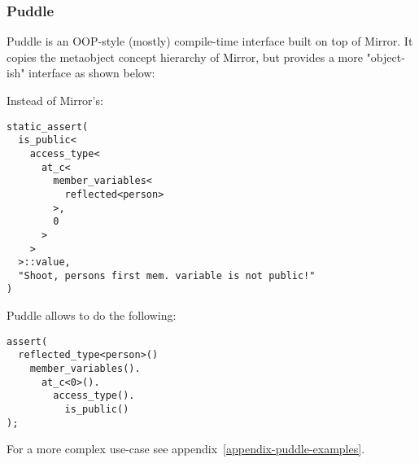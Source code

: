 \subsubsection{Puddle}

Puddle is an OOP-style (mostly) compile-time interface built on top
of Mirror. It copies the metaobject concept hierarchy of Mirror,
but provides a more "object-ish" interface as shown below:

Instead of Mirror's:

\begin{verbatim}
static_assert(
  is_public<
    access_type<
      at_c<
        member_variables<
          reflected<person>
        >,
        0
      >
    >
  >::value,
  "Shoot, persons first mem. variable is not public!"
)

\end{verbatim}

Puddle allows to do the following:

\begin{verbatim}
assert(
  reflected_type<person>()
    member_variables().
      at_c<0>().
        access_type().
          is_public()
);
\end{verbatim}

For a more complex use-case see appendix~\ref{appendix-puddle-examples}.
